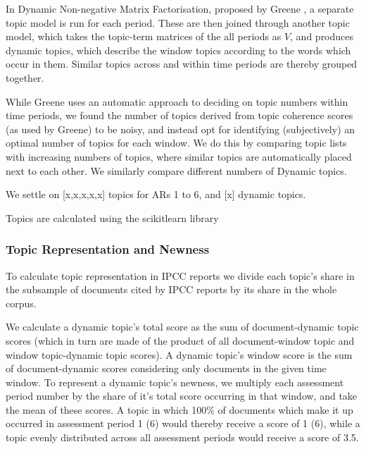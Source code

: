 \documentclass{article}
\begin{document}
\begin{linenumbers}
	In Dynamic Non-negative Matrix Factorisation, proposed by Greene \cite{Greene2016}, a separate topic model is run for each period. These are then joined through another topic model, which takes the topic-term matrices of the all periods as \( V \), and produces dynamic topics, which describe the window topics according to the words which occur in them. Similar topics across and within time periods are thereby grouped together.
	
	While Greene uses an automatic approach to deciding on topic numbers within time periods, we found the number of topics derived from topic coherence scores (as used by Greene) to be noisy, and instead opt for  identifying (subjectively) an optimal number of topics for each window. We do this by comparing topic lists with increasing numbers of topics, where similar topics are automatically placed next to each other. We similarly compare different numbers of Dynamic topics.
	
	We settle on [x,x,x,x,x] topics for ARs 1 to 6, and [x] dynamic topics.
	
	Topics are calculated using the scikitlearn library \cite{Pedregosa2011}
		
	\subsubsection*{Topic Representation and Newness}
	
	To calculate topic representation in IPCC reports we divide each topic's share in the subsample of documents cited by IPCC reports by its share in the whole corpus. 
	
	We calculate a dynamic topic's total score as the sum of document-dynamic topic scores (which in turn are made of the product of all document-window topic and window topic-dynamic topic scores). A dynamic topic's window score is the sum of document-dynamic scores considering only documents in the given time window. To represent a dynamic topic's newness, we multiply each assessment period number by the share of it's total score occurring in that window, and take the mean of these scores. A topic in which 100\% of documents which make it up occurred in assessment period 1 (6) would thereby receive a score of 1 (6), while a topic evenly distributed across all assessment periods would receive a score of 3.5.
	

\end{linenumbers}
\end{document}
